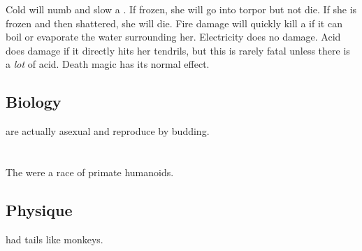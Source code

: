 Cold will numb and slow a \naiad{}. If frozen, she will go into torpor but not die. If she is frozen and then shattered, she will die. Fire damage will quickly kill a \naiad{} if it can boil or evaporate the water surrounding her. Electricity does no damage. Acid does damage if it directly hits her tendrils, but this is rarely fatal unless there is a \emph{lot} of acid. Death magic has its normal effect. 









\subsection{Biology}
\Naiads{} are actually asexual and reproduce by budding. 
































\section{\Nephil}
\index{\nephil}
The \nephilim were a race of primate humanoids. 









\subsection{Physique}
\Nephilim had tails like monkeys.

